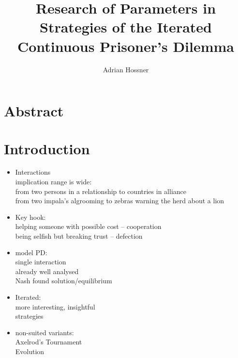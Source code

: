 \documentclass{article}
\title{Research of Parameters in Strategies of the Iterated Continuous Prisoner's Dilemma}
\author{Adrian Hossner}
\date{ } %
\begin{document}
\maketitle

\newpage
\tableofcontents
\newpage

\section*{Abstract}

\section{Introduction}

\begin{itemize}


	\item Interactions\\
		implication range is wide:\\
		from two persons in a relationship to countries in alliance\\
		from two impala's algrooming to zebras warning the herd about a lion \\

	\item Key hook:\\
		helping someone with possible cost -- cooperation\\
		being selfish but breaking trust -- defection\\

	\item model PD:\\
		single interaction\\
		already well analysed\\
		Nash found solution/equilibrium\\

	\item Iterated:\\
		more interesting, insightful\\
		strategies\\

	\item non-suited variants:\\
		Axelrod's Tournament\\
		Evolution\\


\end{itemize}
\end{document}
